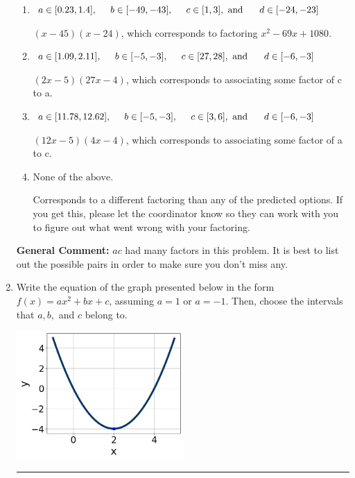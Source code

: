 \documentclass{extbook}[14pt]
\newcommand{\litem}[1]{\item #1

\rule{\textwidth}{0.4pt}}
\begin{document}
\begin{enumerate}
{\begin{enumerate}[label=\Alph*.]
* $(6x -5)(9x -4)$, which is the correct option.
\item \( a \in [0.23, 1.4], \hspace*{5mm} b \in [-49, -43], \hspace*{5mm} c \in [1, 3], \text{ and } \hspace*{5mm} d \in [-24, -23] \)

 $(x -45)(x -24)$, which corresponds to factoring $x^{2} -69 x + 1080$.
\item \( a \in [1.09, 2.11], \hspace*{5mm} b \in [-5, -3], \hspace*{5mm} c \in [27, 28], \text{ and } \hspace*{5mm} d \in [-6, -3] \)

 $(2x -5)(27x -4)$, which corresponds to associating some factor of c to a.
\item \( a \in [11.78, 12.62], \hspace*{5mm} b \in [-5, -3], \hspace*{5mm} c \in [3, 6], \text{ and } \hspace*{5mm} d \in [-6, -3] \)

 $(12x -5)(4x -4)$, which corresponds to associating some factor of a to c.
\item \( \text{None of the above.} \)

 Corresponds to a different factoring than any of the predicted options. If you get this, please let the coordinator know so they can work with you to figure out what went wrong with your factoring.
\end{enumerate}

\textbf{General Comment:} $ac$ had many factors in this problem. It is best to list out the possible pairs in order to make sure you don't miss any.
}
\litem{
Write the equation of the graph presented below in the form $f(x)=ax^2+bx+c$, assuming  $a=1$ or $a=-1$. Then, choose the intervals that $a, b,$ and $c$ belong to.

\begin{center}
    \includegraphics[width=0.5\textwidth]{../Figures/quadraticGraphToEquationCopyC.png}
\end{center}


}
\end{enumerate}
\end{document}
